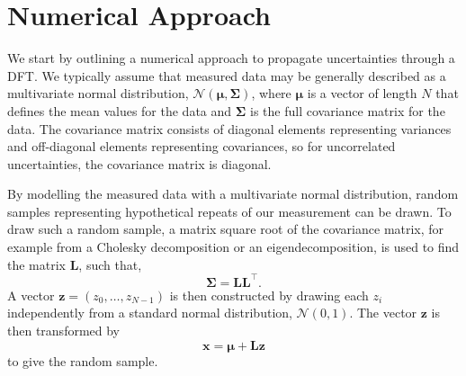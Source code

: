 \documentclass[reprint,
               superscriptaddress,
               nobibnotes,
               amsmath,
               amssymb,
               aps,
               hidelinks, 
               pre]{revtex4-2}
\begin{document}
\section{Numerical Approach}
\label{sec:num}

We start by outlining a numerical approach to propagate uncertainties through a DFT.
We typically assume that measured data may be generally described as a multivariate normal distribution, $\mathcal{N}\left(\boldsymbol{\mu}, \boldsymbol{\Sigma}\right)$, where $\boldsymbol{\mu}$ is a vector of length $N$ that defines the mean values for the data and $\boldsymbol{\Sigma}$ is the full covariance matrix for the data. 
The covariance matrix consists of diagonal elements representing variances and off-diagonal elements representing covariances, so for uncorrelated uncertainties, the covariance matrix is diagonal. 

By modelling the measured data with a multivariate normal distribution, random samples representing hypothetical repeats of our measurement can be drawn. 
To draw such a random sample, a matrix square root of the covariance matrix, for example from a Cholesky decomposition or an eigendecomposition, is used to find the matrix $\mathbf{L}$, such that, 
%
\begin{equation}
    \boldsymbol{\Sigma} = \mathbf{L}\mathbf{L}^\top.
\end{equation}
%
A vector $\mathbf{z}=\left(z_0, \ldots, z_{N-1}\right)$ is then constructed by drawing each $z_i$ independently from a standard normal distribution, $\mathcal{N}(0, 1)$. 
The vector $\mathbf{z}$ is then transformed by 
%
\begin{equation}
    \mathbf{x} = \boldsymbol{\mu} + \mathbf{L}\mathbf{z}
\end{equation}
%
to give the random sample.
\end{document}
